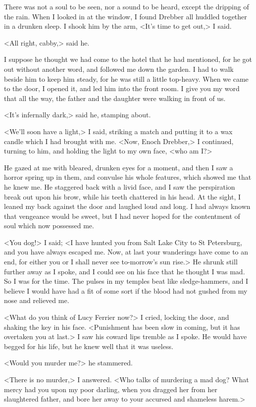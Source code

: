 There was not a soul to be seen, nor a sound to be heard, except the dripping of the rain. When I looked in at the window, I found Drebber all huddled together in a drunken sleep. I shook him by the arm, <It's time to get out,> I said.

<All right, cabby,> said he.

I suppose he thought we had come to the hotel that he had mentioned, for he got out without another word, and followed me down the garden. I had to walk beside him to keep him steady, for he was still a little top-heavy. When we came to the door, I opened it, and led him into the front room. I give you my word that all the way, the father and the daughter were walking in front of us.

<It's infernally dark,> said he, stamping about.

<We'll soon have a light,> I said, striking a match and putting it to a wax candle which I had brought with me. <Now, Enoch Drebber,> I continued, turning to him, and holding the light to my own face, <who am I\@?>

He gazed at me with bleared, drunken eyes for a moment, and then I saw a horror spring up in them, and convulse his whole features, which showed me that he knew me. He staggered back with a livid face, and I saw the perspiration break out upon his brow, while his teeth chattered in his head. At the sight, I leaned my back against the door and laughed loud and long. I had always known that vengeance would be sweet, but I had never hoped for the contentment of soul which now possessed me.

<You dog!> I said; <I have hunted you from Salt Lake City to St Petersburg, and you have always escaped me. Now, at last your wanderings have come to an end, for either you or I shall never see to-morrow's sun rise.> He shrunk still further away as I spoke, and I could see on his face that he thought I was mad. So I was for the time. The pulses in my temples beat like sledge-hammers, and I believe I would have had a fit of some sort if the blood had not gushed from my nose and relieved me.

<What do you think of Lucy Ferrier now?> I cried, locking the door, and shaking the key in his face. <Punishment has been slow in coming, but it has overtaken you at last.> I saw his coward lips tremble as I spoke. He would have begged for his life, but he knew well that it was useless.

<Would you murder me?> he stammered.

<There is no murder,> I answered. <Who talks of murdering a mad dog? What mercy had you upon my poor darling, when you dragged her from her slaughtered father, and bore her away to your accursed and shameless harem.>

